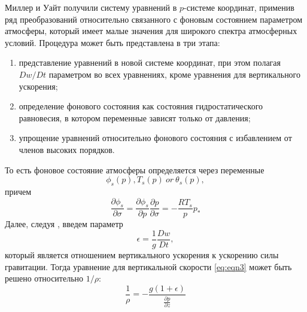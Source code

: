 Миллер и Уайт \citep{MillerWhite1984} получили систему уравнений в $p$-системе координат, применив ряд преобразований относительно связанного с фоновым состоянием параметром атмосферы, который имеет малые значения для широкого спектра атмосферных условий. Процедура может быть представлена в три этапа: \\
\begin{enumerate}
\item представление уравнений в новой системе координат, при этом полагая $Dw/Dt$ параметром во всех уравнениях, кроме уравнения для вертикального ускорения;
\item определение фонового состояния как состояния гидростатического равновесия, в котором переменные зависят только от давления;
\item упрощение уравнений относительно фонового состояния с избавлением от членов высоких порядков.
\end{enumerate}

То есть фоновое состояние атмосферы определяется через переменные $$\phi_s(p), T_s(p)~or~\theta_s(p),$$
причем
\begin{equation}
\frac{\partial\phi_s}{\partial\sigma}=\frac{\partial\phi_s}{\partial p}\frac{\partial p}{\partial\sigma}=-\frac{RT_s}{p}p_*
\end{equation}
Далее, следуя \citep{MillerWhite1984}, введем параметр
\begin{equation}
\epsilon=\frac{1}{g}\frac{Dw}{Dt},
\end{equation}
который является отношением вертикального ускорения к ускорению силы гравитации. Тогда уравнение для вертикальной скорости \eqref{eq:eqn3} может быть решено относительно $1/\rho$:
\begin{equation}
\frac{1}{\rho}=-\frac{g(1+\epsilon)}{\frac{\partial p}{\partial z}} \label{eq:vol}
\end{equation}

